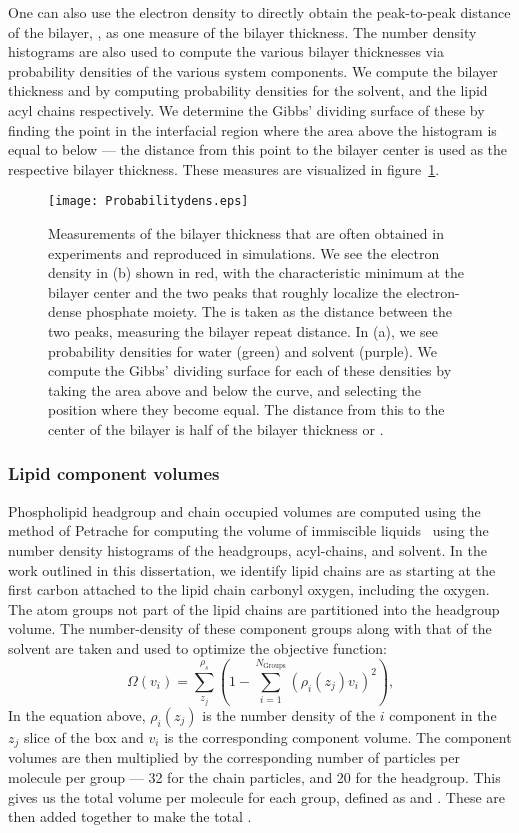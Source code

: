 One can also use the electron density to directly obtain the peak-to-peak distance of the bilayer, \dhh{}, as one measure
of the bilayer thickness. 
The number density histograms are also used to compute the various bilayer thicknesses via probability densities
of the various system components. We compute the bilayer thickness \db{} and \dc{} by computing probability densities
for the solvent, and the lipid acyl chains respectively. We determine the Gibbs' dividing surface of these by finding the point in the interfacial region
where the area above the histogram is equal to below --- the distance from this point to the bilayer center is used as the respective bilayer thickness.
These measures are visualized in figure~\ref{figch1:thicknesses}.
\begin{figure}[h!tb]
    \caption[Diagram of bilayer thickness measurements]{Measurements of the bilayer thickness that are often obtained in experiments and reproduced in simulations. We see the electron density in (b) shown in red,
    with the characteristic minimum at the bilayer center and the two peaks that roughly localize the electron-dense phosphate moiety. The \dhh{} is taken as the distance between the two peaks,
    measuring the bilayer repeat distance. In (a), we see probability densities for water (green) and solvent (purple). We compute the Gibbs' dividing surface for each of these densities by taking the area 
    above and below the curve, and selecting the position where they become equal. The distance from this to the center of the bilayer is half of the bilayer thickness \db{} or \dc{}.}
    \label{figch1:thicknesses}
    \texttt{[image: Probabilitydens.eps]}
\end{figure}
\subsubsection{Lipid component volumes}
Phospholipid headgroup and chain occupied volumes are computed using the method of Petrache \etal{} for computing the
volume of immiscible liquids~\cite{petrache:1997} using the number density histograms of the headgroups, acyl-chains, and solvent.
In the work outlined in this dissertation, we identify lipid chains are as starting 
at the first carbon attached to the lipid chain carbonyl oxygen, including the oxygen.
The atom groups not part of the lipid
chains are partitioned into the headgroup volume. 
The number-density of these component groups along with that of the solvent are taken 
and used to optimize the objective function:
\begin{equation}
    \label{eq:volumeobj}
    \Omega(v_i)=\sum^{\rho_s}_{z_j}(1-\sum^{N_{\text{Groups}}}_{i=1}{(\rho_i(z_j)v_i)^2})\text{,}
\end{equation}
In the equation above, $\rho_i(z_j)$ is the number density of the $i$ component in the
$z_j$ slice of the box and $v_i$ is the corresponding component volume. 
The component volumes are then multiplied by the corresponding
number of particles per molecule per group --- 32 for the chain
particles, and 20 for the headgroup. 
This gives us the total volume per molecule for each group, defined as \Vh{} and \Vc{}. These are then
added together to make the total \Vl{}.
